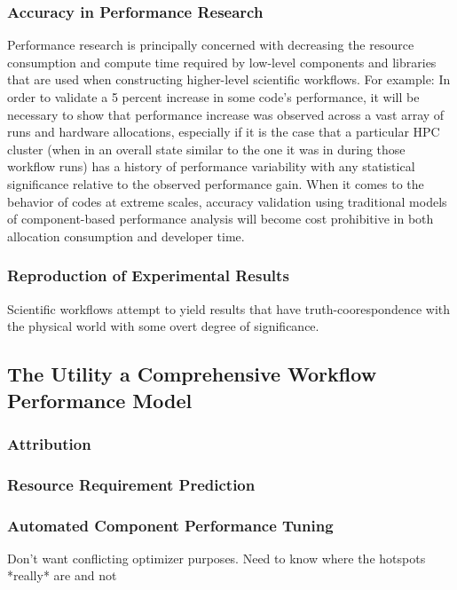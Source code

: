 \subsubsection{Accuracy in Performance Research}
 Performance research is
principally concerned with decreasing the resource consumption and
compute time required by low-level components and libraries that are
used when constructing higher-level scientific workflows. For example:
In order to validate a 5 percent increase in some code's performance,
it will be necessary to show that performance increase was observed
across a vast array of runs and hardware allocations, especially if it
is the case that a particular HPC cluster (when in an overall state
similar to the one it was in during those workflow runs) has a history
of performance variability with any statistical significance relative
to the observed performance gain. When it comes to the behavior of
codes at extreme scales, accuracy validation using traditional models
of component-based performance analysis will become cost prohibitive
in both allocation consumption and developer time.

\subsubsection{Reproduction of Experimental Results}
Scientific workflows attempt to yield results that have
truth-coorespondence with the physical world with some overt degree of
significance.


\subsection{The Utility a Comprehensive Workflow Performance Model}
\subsubsection{Attribution}
\subsubsection{Resource Requirement Prediction}
\subsubsection{Automated Component Performance Tuning}
Don't want conflicting optimizer purposes. Need to know where the
hotspots *really* are and not

